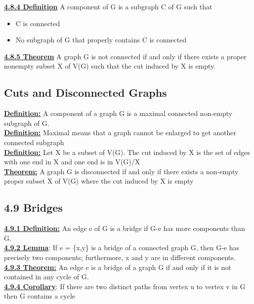 \documentclass[12pt]{article}
\newcommand{\myt}[1]{\textbf{\underline{#1}}}
\begin{document}
	\myt{4.8.4 Definition} A component of G is a subgraph C of G such that\\
	\begin{itemize}
		\item C is connected
		\item No subgraph of G that properly contains C is connected
	\end{itemize}
	
	\myt{4.8.5 Theorem} A graph G is not connected if and only if there exists a proper nonempty subset X of V(G) such that the cut induced by X is empty.\\
	
	\subsection*{Cuts and Disconnected Graphs}
	\myt{Definition:} A component of a graph G is a maximal connected non-empty subgraph of G.\\
	
	\myt{Definition:} Maximal means that a graph cannot be enlarged to get another connected subgraph\\
	
	\myt{Definition:} Let X be a subset of V(G). The cut induced by X is the set of edges with one end in X and one end is in V(G)/X\\
	
	\myt{Theorem:} A graph G is disconnected if and only if there exists a non-empty proper subset X of V(G) where the cut induced by X is empty\\
	
	
	\subsection*{4.9 Bridges}
	\myt{4.9.1 Definition:} An edge e of G is a bridge if G-e has more components than G.\\
	
	\myt{4.9.2 Lemma}: If e = \{x,y\} is a bridge of a connected graph G, then G-e has precisely two components; furthermore, x and y are in different components.\\
	
	\myt{4.9.3 Theorem:} An edge e is a bridge of a graph G if and only if it is not contained in any cycle of G.\\
	
	\myt{4.9.4 Corollary}: If there are two distinct paths from vertex u to vertex v in G then G contains a cycle\\
	
\end{document}
